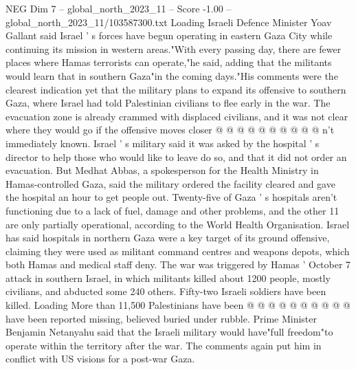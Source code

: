 \begin{textsample}{NEG Dim 7 – global\_north\_2023\_11 – Score -1.00 – global\_north\_2023\_11/103587300.txt}
Loading Israeli Defence Minister Yoav Gallant said Israel ' s forces have begun operating in eastern Gaza City while continuing its mission in western areas."With every passing day, there are fewer places where Hamas terrorists can operate,"he said, adding that the militants would learn that in southern Gaza"in the coming days."His comments were the clearest indication yet that the military plans to expand its offensive to southern Gaza, where Israel had told Palestinian civilians to flee early in the war.
The evacuation zone is already crammed with displaced civilians, and it was not clear where they would go if the offensive moves closer @ @ @ @ @ @ @ @ @ @ n't immediately known.
Israel ' s military said it was asked by the hospital ' s director to help those who would like to leave do so, and that it did not order an evacuation.
But Medhat Abbas, a spokesperson for the Health Ministry in Hamas-controlled Gaza, said the military ordered the facility cleared and gave the hospital an hour to get people out.
Twenty-five of Gaza ' s hospitals aren't functioning due to a lack of fuel, damage and other problems, and the other 11 are only partially operational, according to the World Health Organisation.
Israel has said hospitals in northern Gaza were a key target of its ground offensive, claiming they were used as militant command centres and weapons depots, which both Hamas and medical staff deny.
The war was triggered by Hamas ' October 7 attack in southern Israel, in which militants killed about 1200 people, mostly civilians, and abducted some 240 others.
Fifty-two Israeli soldiers have been killed.
Loading More than 11,500 Palestinians have been @ @ @ @ @ @ @ @ @ @ have been reported missing, believed buried under rubble.
Prime Minister Benjamin Netanyahu said that the Israeli military would have"full freedom"to operate within the territory after the war.
The comments again put him in conflict with US visions for a post-war Gaza.

\end{textsample}
